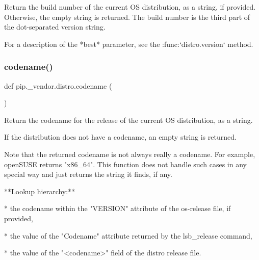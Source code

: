 \begin{DoxyVerb}Return the build number of the current OS distribution, as a string,
if provided.
Otherwise, the empty string is returned. The build number is the third part
of the dot-separated version string.

For a description of the *best* parameter, see the :func:`distro.version`
method.
\end{DoxyVerb}
 \mbox{\label{namespacepip_1_1__vendor_1_1distro_ae28a5690d8f0b03567eb4a8e04c597e1}} 
\subsubsection{\texorpdfstring{codename()}{codename()}}
{\footnotesize\ttfamily def pip.\+\_\+vendor.\+distro.\+codename (\begin{DoxyParamCaption}{ }\end{DoxyParamCaption})}

\begin{DoxyVerb}Return the codename for the release of the current OS distribution,
as a string.

If the distribution does not have a codename, an empty string is returned.

Note that the returned codename is not always really a codename. For
example, openSUSE returns "x86_64". This function does not handle such
cases in any special way and just returns the string it finds, if any.

**Lookup hierarchy:**

* the codename within the "VERSION" attribute of the os-release file, if
  provided,

* the value of the "Codename" attribute returned by the lsb_release
  command,

* the value of the "<codename>" field of the distro release file.
\end{DoxyVerb}
 \mbox{\label{namespacepip_1_1__vendor_1_1distro_ab18c2e2b38d820e5d00e07154f298609}} 

